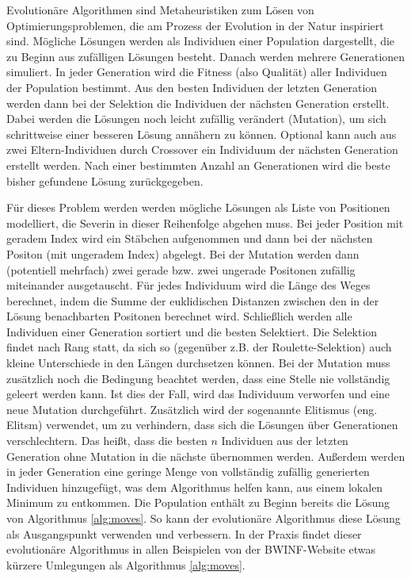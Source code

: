\documentclass[a4paper,10pt,ngerman]{scrartcl}
\begin{document}
Evolutionäre Algorithmen sind Metaheuristiken zum Lösen von Optimierungsproblemen, die am Prozess der Evolution in der Natur inspiriert sind. 
Mögliche Lösungen werden als Individuen einer Population dargestellt, die zu Beginn aus zufälligen Lösungen besteht. 
Danach werden mehrere Generationen simuliert. 
In jeder Generation wird die Fitness (also Qualität) aller Individuen der Population bestimmt.
Aus den besten Individuen der letzten Generation werden dann bei der Selektion die Individuen der nächsten Generation erstellt. 
Dabei werden die Lösungen noch leicht zufällig verändert (Mutation), um sich schrittweise einer besseren Lösung annähern zu können.
Optional kann auch aus zwei Eltern-Individuen durch Crossover ein Individuum der nächsten Generation erstellt werden. 
Nach einer bestimmten Anzahl an Generationen wird die beste bisher gefundene Lösung zurückgegeben.

Für dieses Problem werden werden mögliche Lösungen als Liste von Positionen modelliert, die Severin in dieser Reihenfolge abgehen muss. 
Bei jeder Position mit geradem Index wird ein Stäbchen aufgenommen und dann bei der nächsten Positon (mit ungeradem Index) abgelegt. 
Bei der Mutation werden dann (potentiell mehrfach) zwei gerade bzw. zwei ungerade Positonen zufällig miteinander ausgetauscht. 
Für jedes Individuum wird die Länge des Weges berechnet, indem die Summe der euklidischen Distanzen zwischen den in der Lösung benachbarten Positonen berechnet wird.
Schließlich werden alle Individuen einer Generation sortiert und die besten Selektiert.
Die Selektion findet nach Rang statt, da sich so (gegenüber z.B. der Roulette-Selektion) auch kleine Unterschiede in den Längen durchsetzen können. 
Bei der Mutation muss zusätzlich noch die Bedingung beachtet werden, dass eine Stelle nie vollständig geleert werden kann.
Ist dies der Fall, wird das Individuum verworfen und eine neue Mutation durchgeführt. 
Zusätzlich wird der sogenannte Elitismus (eng. Elitsm) verwendet, um zu verhindern, dass sich die Lösungen über Generationen verschlechtern. 
Das heißt, dass die besten $n$ Individuen aus der letzten Generation ohne Mutation in die nächste übernommen werden. 
Außerdem werden in jeder Generation eine geringe Menge von vollständig zufällig generierten Individuen hinzugefügt, was dem Algorithmus helfen kann, aus einem lokalen Minimum zu entkommen. 
Die Population enthält zu Beginn bereits die Lösung von Algorithmus \ref{alg:moves}. So kann der evolutionäre Algorithmus diese Lösung als Ausgangspunkt verwenden und verbessern. 
In der Praxis findet dieser evolutionäre Algorithmus in allen Beispielen von der BWINF-Website etwas kürzere Umlegungen als Algorithmus \ref{alg:moves}.
\end{document}

